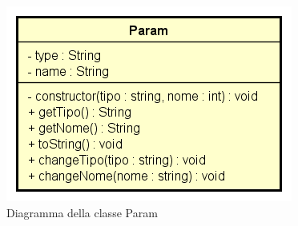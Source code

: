 \begin{figure}[h!]
	\centering
	\includegraphics[scale=0.8]{res/sections/SpecificaFrontEnd/Services/Disegnetti/param.png}
	\caption{Diagramma della classe Param}
\end{figure}

